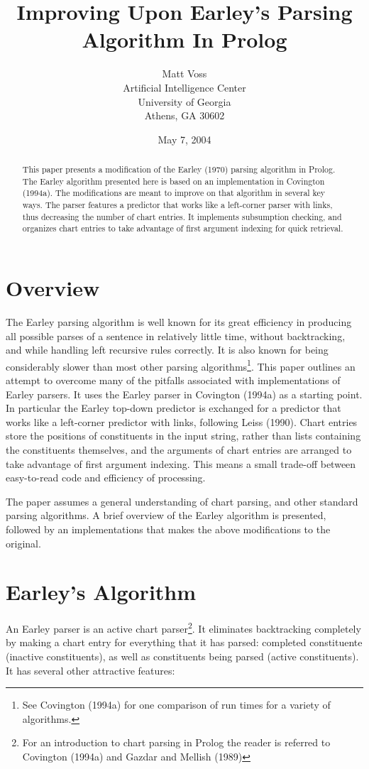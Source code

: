 \documentclass[12pt]{article}
\title{Improving Upon Earley's Parsing Algorithm In Prolog}
\author{Matt Voss \\Artificial Intelligence Center \\University of Georgia \\Athens, GA 30602}
\date{May 7, 2004}
\begin{document}
\maketitle

\begin{abstract}
This paper presents a modification of the Earley (1970) parsing algorithm in Prolog.  The Earley algorithm presented here is based on an implementation in Covington (1994a).  The modifications are meant to improve on that algorithm in several key ways.  The parser features a predictor that works like a left-corner parser with links, thus decreasing the number of chart entries. It implements subsumption checking, and organizes chart entries to take advantage of first argument indexing for quick retrieval.
\end{abstract}


\section{Overview}
The Earley parsing algorithm is well known for its great efficiency in producing all possible parses of a sentence in relatively little time, without backtracking, and while handling left recursive rules correctly.  It is also known for being considerably slower than most other parsing algorithms\footnote{See Covington (1994a) for one comparison of run times for a variety of algorithms.}.  This paper outlines an attempt to overcome many of the pitfalls associated with implementations of Earley parsers.  It uses the Earley parser in Covington (1994a) as a starting point.  In particular the Earley top-down predictor is exchanged for a predictor that works like a left-corner predictor with links, following Leiss (1990).  Chart entries store the positions of constituents in the input string, rather than lists containing the constituents themselves, and the arguments of chart entries are arranged to take advantage of first argument indexing.  This means a small trade-off between easy-to-read code and efficiency of processing.

The paper assumes a general understanding of chart parsing, and other standard parsing algorithms. A brief overview of the Earley algorithm is presented, followed by an implementations that makes the above modifications to the original.

\section{Earley's Algorithm}
An Earley parser is an active chart parser\footnote{For an introduction to chart parsing in Prolog the reader is referred to Covington (1994a) and Gazdar and Mellish (1989)}.  It eliminates backtracking completely by making a chart entry for everything that it has parsed: completed constituente (inactive constituents), as well as constituents being parsed (active constituents).  It has several other attractive features:
\end{document}
